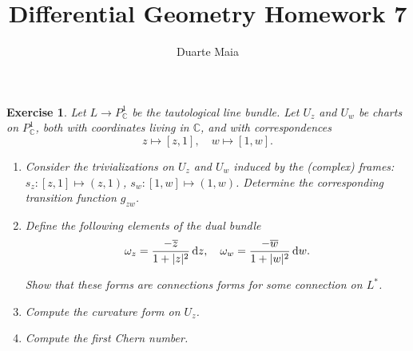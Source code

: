 \documentclass{article}
\title{Differential Geometry Homework 7}
\author{Duarte Maia}
\date{}
\newtheorem{ex}{Exercise}
\theoremstyle{nonumberplain}
\newcommand{\C}{\mathbb{C}}
\DeclarePairedDelimiter{\abs}{\lvert}{\rvert}
\newcommand{\pc}{P^1_\C}
\begin{document}
\maketitle

\begin{ex}
Let $L \to \pc$ be the tautological line bundle. Let $U_z$ and $U_w$ be charts on $\pc$, both with coordinates living in $\C$, and with correspondences
\[z \mapsto [z,1], \quad w \mapsto [1,w].\]

\begin{enumerate}
\item Consider the trivializations on $U_z$ and $U_w$ induced by the (complex) frames: $s_z \colon [z,1] \mapsto (z,1)$, $s_w \colon [1,w] \mapsto (1,w)$. Determine the corresponding transition function $g_{zw}$.

\item Define the following elements of the dual bundle
\[ \omega_z = \frac{-\overline{z}}{1+\abs{z}^2} \dl z, \quad \omega_w = \frac{-\overline{w}}{1+\abs{w}^2} \dl w.\]

Show that these forms are connections forms for some connection on $L^*$.

\item Compute the curvature form on $U_z$.

\item Compute the first Chern number.
\end{enumerate}
\end{ex}
\end{document}
